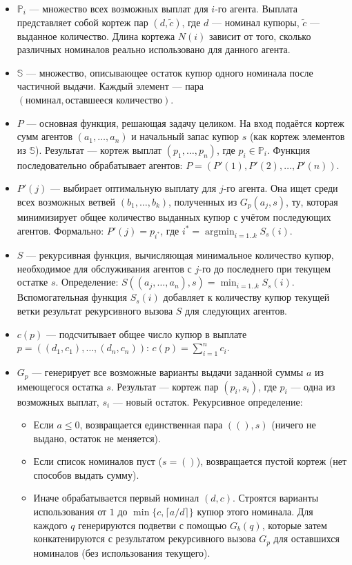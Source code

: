 \documentclass[12pt]{extarticle}
\begin{document}
\begin{itemize}
  \item $\mathbb{P}_i$ — множество всех возможных выплат для $i$-го агента. Выплата представляет собой кортеж пар $(d, \tilde{c})$, где $d$ — номинал купюры, $\tilde{c}$ — выданное количество. Длина кортежа $N(i)$ зависит от того, сколько различных номиналов реально использовано для данного агента.
  \item $\mathbb{S}$ — множество, описывающее остаток купюр одного номинала после частичной выдачи. Каждый элемент — пара $(\text{номинал}, \text{оставшееся количество})$.
  \item $P$ — основная функция, решающая задачу целиком. На вход подаётся кортеж сумм агентов $(a_1,\dots,a_n)$ и начальный запас купюр $s$ (как кортеж элементов из $\mathbb{S}$). Результат — кортеж выплат $(p_1,\dots,p_n)$, где $p_i \in \mathbb{P}_i$. Функция последовательно обрабатывает агентов: $P = (P'(1),  P'(2), \dots, P'(n))$.
  \item $P'(j)$ — выбирает оптимальную выплату для $j$-го агента. Она ищет среди всех возможных ветвей $(b_1,\dots,b_k)$, полученных из $G_p(a_j, s)$, ту, которая минимизирует общее количество выданных купюр с учётом последующих агентов. Формально: $P'(j) = p_{i^*}$, где $i^* = \operatorname{argmin}_{i=1..k} S_s(i)$.
  \item $S$ — рекурсивная функция, вычисляющая минимальное количество купюр, необходимое для обслуживания агентов с $j$-го до последнего при текущем остатке $s$. Определение: $S((a_j,\dots,a_n), s) = \min_{i=1..k} S_s(i)$. Вспомогательная функция $S_s(i)$ добавляет к количеству купюр текущей ветки результат рекурсивного вызова $S$ для следующих агентов.
  \item $c(p)$ — подсчитывает общее число купюр в выплате $p = ((d_1,c_1),\dots,(d_n,c_n))$: $c(p) = \sum_{i=1}^n c_i$.
  \item $G_p$ — генерирует все возможные варианты выдачи заданной суммы $a$ из имеющегося остатка $s$. Результат — кортеж пар $(p_i, s_i)$, где $p_i$ — одна из возможных выплат, $s_i$ — новый остаток. Рекурсивное определение:
    \begin{itemize}
      \item Если $a \le 0$, возвращается единственная пара $((), s)$ (ничего не выдано, остаток не меняется).
      \item Если список номиналов пуст ($s = ()$), возвращается пустой кортеж (нет способов выдать сумму).
      \item Иначе обрабатывается первый номинал $(d, c)$. Строятся варианты использования от $1$ до $\min\{c, \lceil a/d \rceil\}$ купюр этого номинала. Для каждого $q$ генерируются подветви с помощью $G_b(q)$, которые затем конкатенируются с результатом рекурсивного вызова $G_p$ для оставшихся номиналов (без использования текущего).

\end{itemize}
\end{itemize}
\end{document}
